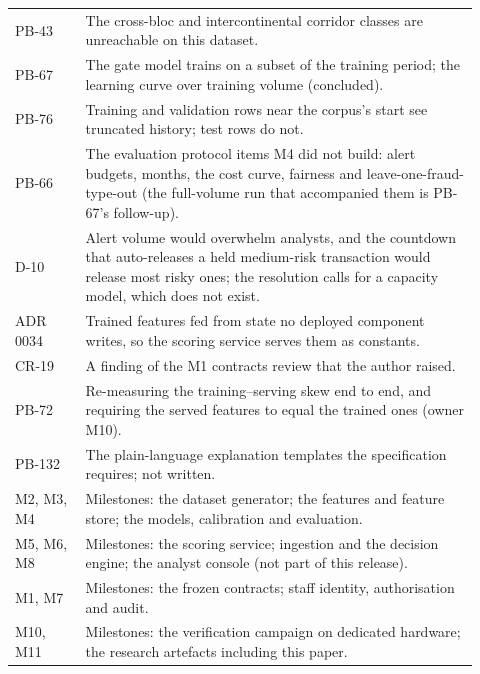 \begin{longtable}{p{0.14\linewidth}p{0.78\linewidth}}
PB-43 & The cross-bloc and intercontinental corridor classes are unreachable on this dataset. \\
PB-67 & The gate model trains on a subset of the training period; the learning curve over training volume (concluded). \\
PB-76 & Training and validation rows near the corpus's start see truncated history; test rows do not. \\
PB-66 & The evaluation protocol items M4 did not build: alert budgets, months, the cost curve, fairness and leave-one-fraud-type-out (the full-volume run that accompanied them is PB-67's follow-up). \\
D-10 & Alert volume would overwhelm analysts, and the countdown that auto-releases a held medium-risk transaction would release most risky ones; the resolution calls for a capacity model, which does not exist. \\
ADR 0034 & Trained features fed from state no deployed component writes, so the scoring service serves them as constants. \\
CR-19 & A finding of the M1 contracts review that the author raised. \\
PB-72 & Re-measuring the training--serving skew end to end, and requiring the served features to equal the trained ones (owner M10). \\
PB-132 & The plain-language explanation templates the specification requires; not written. \\
M2, M3, M4 & Milestones: the dataset generator; the features and feature store; the models, calibration and evaluation. \\
M5, M6, M8 & Milestones: the scoring service; ingestion and the decision engine; the analyst console
(not part of this release). \\
M1, M7 & Milestones: the frozen contracts; staff identity, authorisation and audit. \\
M10, M11 & Milestones: the verification campaign on dedicated hardware; the research artefacts including this paper. \\
\bottomrule
\end{longtable}

